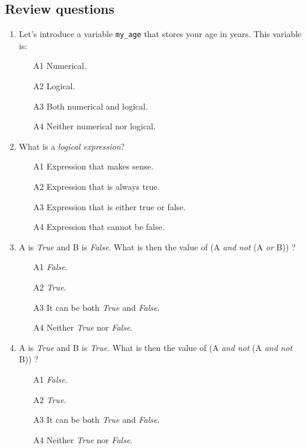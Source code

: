 \documentclass[article,A4,12pt]{llncs}
\begin{document}
{{{{\begin{center}
\end{center}


\subsection{Review questions}

\begin{enumerate}
\item Let's introduce a variable {\tt my\_age} that stores your age in years.
      This variable is:
\begin{enumerate}
\item[A1] Numerical.
\item[A2] Logical.
\item[A3] Both numerical and logical.
\item[A4] Neither numerical nor logical.
\end{enumerate}
\item What is a {\em logical expression}? 
\begin{enumerate}
\item[A1] Expression that makes sense.
\item[A2] Expression that is always true. 
\item[A3] Expression that is either true or false.
\item[A4] Expression that cannot be false.
\end{enumerate}
\item A is {\em True} and B is {\em False}. What is then the value of (A {\em and} {\em not} (A {\em or} B)) ?
\begin{enumerate}
\item[A1] {\em False}.
\item[A2] {\em True}.
\item[A3] It can be both {\em True} and {\em False}.
\item[A4] Neither {\em True} nor {\em False}.
\end{enumerate}
\item A is {\em True} and B is {\em True}. What is then the value of (A {\em and} {\em not} (A {\em and} {\em not} B)) ?
\begin{enumerate}
\item[A1] {\em False}.
\item[A2] {\em True}.
\item[A3] It can be both {\em True} and {\em False}.
\item[A4] Neither {\em True} nor {\em False}.
\end{enumerate}
\end{enumerate}

}}}}
\end{document}
